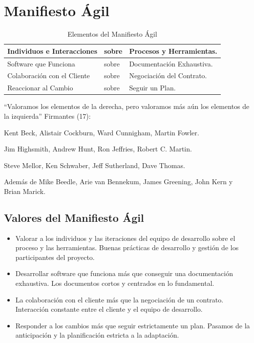 \documentclass[12pt,twoside,titlepage]{report}
\begin{document}
\chapter{Manifiesto Ágil}

\begin{table}[h]
    \begin{center}
        \begin{tabular}{| l | l | l |}
            \hline
            Individuos e Interacciones & sobre & Procesos y Herramientas. \\ \hline
            Software que Funciona & sobre & Documentación Exhaustiva. \\ \hline
            Colaboración con el Cliente & sobre & Negociación del Contrato. \\ \hline
            Reaccionar al Cambio & sobre & Seguir un Plan. \\ \hline
        \end{tabular}
        \caption{Elementos del Manifiesto Ágil}
        \label{tab:fruta}
    \end{center}
\end{table}

“Valoramos los elementos de la derecha, pero valoramos más aún los elementos de la izquierda”
Firmantes (17):

\begin{compactitem}
    \item Kent Beck, Alistair Cockburn, Ward Cunnigham, Martin Fowler.
    \item Jim Highsmith, Andrew Hunt, Ron Jeffries, Robert C. Martin.
    \item Steve Mellor, Ken Schwaber, Jeff Sutherland, Dave Thomas.
    \item Además de Mike Beedle, Arie van Bennekum, James Greening, John Kern y Brian Marick.
\end{compactitem}

\section{Valores del Manifiesto Ágil}
\begin{itemize}
    \item Valorar a los individuos y las iteraciones del equipo de desarrollo sobre el proceso y las herramientas. Buenas prácticas de desarrollo y gestión de los participantes del proyecto.
    \item Desarrollar software que funciona más que conseguir una documentación exhaustiva. Los documentos cortos y centrados en lo fundamental.
    \item La colaboración con el cliente más que la negociación de un contrato. Interacción constante entre el cliente y el equipo de desarrollo.
    \item Responder a los cambios más que seguir estrictamente un plan. Pasamos de la anticipación y la planificación estricta a la adaptación.
\end{itemize}
\end{document}
